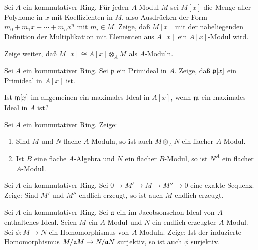 \begin{exercise}
	\label{exer:poly_over_mod}
	Sei \(A\) ein kommutativer Ring. Für jeden \(A\)-Modul \(M\) sei \(M[x]\) die Menge aller Polynome in
	\(x\) mit Koeffizienten in \(M\), also Ausdrücken der Form \(m_0 + m_1 x + \dotsb + m_n x^n\) mit \(m_i \in M\).
	Zeige, daß \(M[x]\) mit der naheliegenden Definition der Multiplikation mit Elementen aus \(A[x]\) ein \(A[x]\)-Modul
	wird.
	
	Zeige weiter, daß \(M[x] \cong A[x] \otimes_A M\) als \(A\)-Moduln.
\end{exercise}

\begin{exercise}
	\label{exer:poly_over_prime}
	Sei \(A\) ein kommutativer Ring. Sei \(\mathfrak{p}\) ein Primideal in \(A\). Zeige, daß \(\mathfrak{p}[x]\) ein Primideal in
	\(A[x]\) ist.
	
	Ist \(\mathfrak{m}[x]\) im allgemeinen ein maximales Ideal in \(A[x]\), wenn \(\mathfrak{m}\) ein maximales Ideal in \(A\) ist?
\end{exercise}

\begin{exercise}
	Sei \(A\) ein kommutativer Ring. Zeige:
	\begin{enumerate}
	\item
		Sind \(M\) und \(N\) flache \(A\)-Moduln, so ist auch \(M \otimes_A N\) ein flacher \(A\)-Modul.
	\item
		Ist \(B\) eine flache \(A\)-Algebra und \(N\) ein flacher \(B\)-Modul, so ist \(N^A\) ein flacher \(A\)-Modul.
	\end{enumerate}
\end{exercise}

\begin{exercise}
	Sei \(A\) ein kommutativer Ring. Sei \(0 \to M' \to M \to M'' \to 0\) eine exakte Sequenz. Zeige: Sind \(M'\) und \(M''\)
	endlich erzeugt, so ist auch \(M\) endlich erzeugt.
\end{exercise}

\begin{exercise}
	Sei \(A\) ein kommutativer Ring. Sei \(\mathfrak{a}\) ein im Jacobsonschon Ideal von \(A\) enthaltenes Ideal. Seien \(M\) ein 
	\(A\)-Modul und \(N\) ein endlich erzeugter \(A\)-Modul. Sei \(\phi\colon M \to N\) ein Homomorphismus von \(A\)-Moduln.
	Zeige: Ist der induzierte Homomorphismus \(M/\mathfrak{a} M \to N/\mathfrak{a} N\) surjektiv, so ist auch \(\phi\) surjektiv.
\end{exercise}

